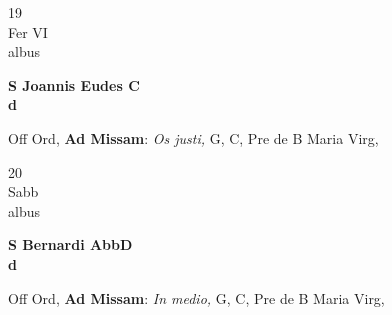\documentclass[10pt, openany]{book}
\begin{document}
        \begin{center}
            \begin{minipage}{3.5in}
                \vspace{2em}
                \begin{minipage}{0.5in}
                    {\Huge 19} \\
                    {\normalsize Fer VI} \\
                    {\normalsize albus}
                \end{minipage}
                \begin{minipage}{3.0in}
                    \textbf{ \large S Joannis Eudes C \\
                    \textnormal{\normalsize d}} \\ 
                \end{minipage}
                \begin{justify}Off Ord, \textbf{Ad Missam}: \textit{Os justi,} G, C, Pre de B Maria Virg,  
                \end{justify}
            \end{minipage}
        \end{center}
    
        \begin{center}
            \begin{minipage}{3.5in}
                \vspace{2em}
                \begin{minipage}{0.5in}
                    {\Huge 20} \\
                    {\normalsize Sabb} \\
                    {\normalsize albus}
                \end{minipage}
                \begin{minipage}{3.0in}
                    \textbf{ \large S Bernardi AbbD \\
                    \textnormal{\normalsize d}} \\ 
                \end{minipage}
                \begin{justify}Off Ord, \textbf{Ad Missam}: \textit{In medio,} G, C, Pre de B Maria Virg,  
                \end{justify}
            \end{minipage}
        \end{center}
    
\end{document}
